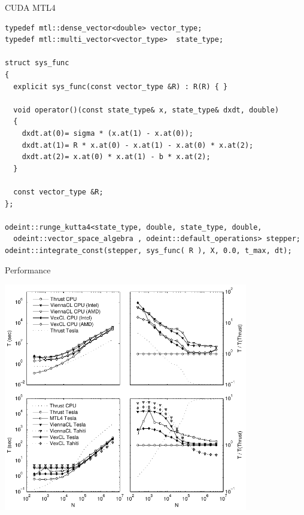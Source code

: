 \documentclass{beamer}
\newcommand{\heading}[1]{\centerline{\Large #1} \vspace{0.5em}}
\begin{document}
\begin{frame}[fragile]
 \heading{CUDA MTL4}

\begin{lstlisting}[basicstyle=\tiny\ttfamily]
typedef mtl::dense_vector<double> vector_type;
typedef mtl::multi_vector<vector_type>  state_type;

struct sys_func
{
  explicit sys_func(const vector_type &R) : R(R) { }

  void operator()(const state_type& x, state_type& dxdt, double)
  {
    dxdt.at(0)= sigma * (x.at(1) - x.at(0));
    dxdt.at(1)= R * x.at(0) - x.at(1) - x.at(0) * x.at(2);
    dxdt.at(2)= x.at(0) * x.at(1) - b * x.at(2);
  }

  const vector_type &R;
};

odeint::runge_kutta4<state_type, double, state_type, double,
  odeint::vector_space_algebra , odeint::default_operations> stepper;
odeint::integrate_const(stepper, sys_func( R ), X, 0.0, t_max, dt);
\end{lstlisting}

\end{frame}


\begin{frame}[fragile]
 \heading{Performance}

 \centerline{\includegraphics[draft=false,width=0.8\textwidth]{lorenz_perf.pdf}}

\end{frame}
\end{document}
